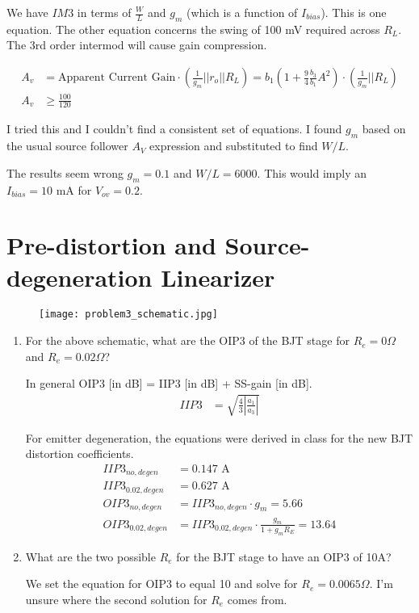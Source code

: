 We have $IM3$ in terms of $\frac{W}{L}$ and $g_m$ (which is a function of $I_{bias}$). This is one equation.
The other equation concerns the swing of 100 mV required across $R_L$. The 3rd order intermod will cause gain compression.

\begin{align*}
    A_v &= \text{Apparent Current Gain} \cdot (\frac{1}{g_m} || r_o || R_L) = b_1(1 + \frac{9}{4} \frac{b_3}{b_1} A^2) \cdot (\frac{1}{g_m} || R_L) \\
    A_v &\geq \frac{100}{120}
\end{align*}

I tried this and I couldn't find a consistent set of equations. I found $g_m$ based on the usual source follower $A_V$ expression and substituted to find $W/L$.

The results seem wrong $g_m = 0.1$ and $W/L = 6000$. This would imply an $I_{bias} = 10$ mA for $V_{ov} = 0.2$.

\section{Pre-distortion and Source-degeneration Linearizer}
\begin{figure}[H]
    \centering \texttt{[image: problem3\_schematic.jpg]}
\end{figure}

\begin{enumerate}[label=(\alph*)]
    \item {\color{blue} For the above schematic, what are the OIP3 of the BJT stage for $R_e = 0 \Omega$ and $R_e = 0.02 \Omega$?}

    In general OIP3 [in dB] = IIP3 [in dB] + SS-gain [in dB].
    \begin{align*}
        IIP3 &= \sqrt{\frac{4}{3} |\frac{a_1}{a_3}|}
    \end{align*}

    For emitter degeneration, the equations were derived in class for the new BJT distortion coefficients.
    \begin{align*}
        IIP3_{no,degen} &= 0.147 \text{ A} \\
        IIP3_{0.02,degen} &= 0.627 \text{ A} \\
        OIP3_{no,degen} &= IIP3_{no,degen} \cdot g_m = 5.66 \\
        OIP3_{0.02,degen} &= IIP3_{0.02,degen} \cdot \frac{g_m}{1 + g_m R_E} = 13.64
    \end{align*}

    \item {\color{blue} What are the two possible $R_e$ for the BJT stage to have an OIP3 of 10A?}

    We set the equation for OIP3 to equal 10 and solve for $R_e = 0.0065 \Omega$.
    I'm unsure where the second solution for $R_e$ comes from.
\end{enumerate}


